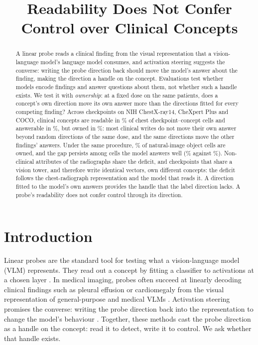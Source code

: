 \documentclass{article}
\title{Readability Does Not Confer Control over Clinical Concepts}
\begin{document}
\maketitle

\begin{abstract}
A linear probe reads a clinical finding from the visual representation that a vision-language model's language model consumes, and activation steering suggests the converse: writing the probe direction back should move the model's answer about the finding, making the direction a handle on the concept. Evaluations test whether models encode findings and answer questions about them, not whether such a handle exists. We test it with \emph{ownership}: at a fixed dose on the same patients, does a concept's own direction move its own answer more than the directions fitted for every competing finding? Across \cfCheckpoints{} checkpoints on NIH ChestX-ray14, CheXpert Plus and COCO, clinical concepts are readable in \cfChestReadablePct{}\% of chest checkpoint--concept cells and answerable in \cfChestAnswerablePct{}\%, but owned in \cfChestOwnedPct{}\%: most clinical writes do not move their own answer beyond random directions of the same dose, and the same directions move the other findings' answers. Under the same procedure, \cfCocoOwnedPct{}\% of natural-image object cells are owned, and the gap persists among cells the model answers well (\cfStratChestTopPct{}\% against \cfStratNatTopPct{}\%). Non-clinical attributes of the radiographs share the deficit, and checkpoints that share a vision tower, and therefore write identical vectors, own different concepts: the deficit follows the chest-radiograph representation and the model that reads it. A direction fitted to the model's own answers provides the handle that the label direction lacks. A probe's readability does not confer control through its direction.
\end{abstract}

\section{Introduction}
\label{sec:introduction}

Linear probes are the standard tool for testing what a vision-language model (VLM) represents. They read out a concept by fitting a classifier to activations at a chosen layer \citep{alain2017understanding,belinkov2022probing}. In medical imaging, probes often succeed at linearly decoding clinical findings such as pleural effusion or cardiomegaly from the visual representation of general-purpose and medical VLMs \citep{zhu2026lost,pedersen2026probes}. Activation steering promises the converse: writing the probe direction back into the representation to change the model's behaviour \citep{turner2023steering,panickssery2024caa}. Together, these methods cast the probe direction as a handle on the concept: read it to detect, write it to control. We ask whether that handle exists.
\end{document}
